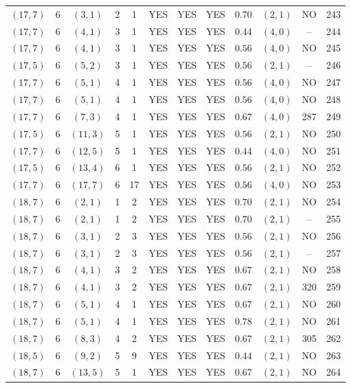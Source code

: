 \begin{longtable}{|c|c|c|c|c|c|c|c|c|c|c|c|}
$(17,7)$ & 6 & $(3,1)$ & 2 & 1 & YES & YES & YES & $0.70$ & $(2,1)$ & NO & 243\\
$(17,7)$ & 6 & $(4,1)$ & 3 & 1 & YES & YES & YES & $0.44$ & $(4,0)$ & -- & 244\\
$(17,7)$ & 6 & $(4,1)$ & 3 & 1 & YES & YES & YES & $0.56$ & $(4,0)$ & NO & 245\\
$(17,5)$ & 6 & $(5,2)$ & 3 & 1 & YES & YES & YES & $0.56$ & $(2,1)$ & -- & 246\\
$(17,7)$ & 6 & $(5,1)$ & 4 & 1 & YES & YES & YES & $0.56$ & $(4,0)$ & NO & 247\\
$(17,7)$ & 6 & $(5,1)$ & 4 & 1 & YES & YES & YES & $0.56$ & $(4,0)$ & NO & 248\\
$(17,7)$ & 6 & $(7,3)$ & 4 & 1 & YES & YES & YES & $0.67$ & $(4,0)$ & 287 & 249\\
$(17,5)$ & 6 & $(11,3)$ & 5 & 1 & YES & YES & YES & $0.56$ & $(2,1)$ & NO & 250\\
$(17,7)$ & 6 & $(12,5)$ & 5 & 1 & YES & YES & YES & $0.44$ & $(4,0)$ & NO & 251\\
$(17,5)$ & 6 & $(13,4)$ & 6 & 1 & YES & YES & YES & $0.56$ & $(2,1)$ & NO & 252\\
$(17,7)$ & 6 & $(17,7)$ & 6 & 17 & YES & YES & YES & $0.56$ & $(4,0)$ & NO & 253\\
$(18,7)$ & 6 & $(2,1)$ & 1 & 2 & YES & YES & YES & $0.70$ & $(2,1)$ & NO & 254\\
$(18,7)$ & 6 & $(2,1)$ & 1 & 2 & YES & YES & YES & $0.70$ & $(2,1)$ & -- & 255\\
$(18,7)$ & 6 & $(3,1)$ & 2 & 3 & YES & YES & YES & $0.56$ & $(2,1)$ & NO & 256\\
$(18,7)$ & 6 & $(3,1)$ & 2 & 3 & YES & YES & YES & $0.56$ & $(2,1)$ & -- & 257\\
$(18,7)$ & 6 & $(4,1)$ & 3 & 2 & YES & YES & YES & $0.67$ & $(2,1)$ & NO & 258\\
$(18,7)$ & 6 & $(4,1)$ & 3 & 2 & YES & YES & YES & $0.67$ & $(2,1)$ & 320 & 259\\
$(18,7)$ & 6 & $(5,1)$ & 4 & 1 & YES & YES & YES & $0.67$ & $(2,1)$ & NO & 260\\
$(18,7)$ & 6 & $(5,1)$ & 4 & 1 & YES & YES & YES & $0.78$ & $(2,1)$ & NO & 261\\
$(18,7)$ & 6 & $(8,3)$ & 4 & 2 & YES & YES & YES & $0.67$ & $(2,1)$ & 305 & 262\\
$(18,5)$ & 6 & $(9,2)$ & 5 & 9 & YES & YES & YES & $0.44$ & $(2,1)$ & NO & 263\\
$(18,7)$ & 6 & $(13,5)$ & 5 & 1 & YES & YES & YES & $0.67$ & $(2,1)$ & NO & 264\\

\end{longtable}
